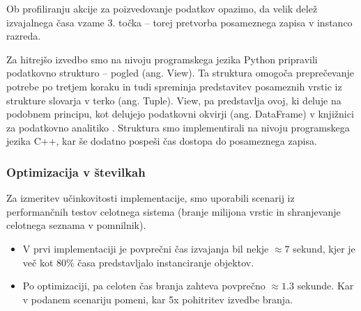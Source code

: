 \documentclass[a4paper,12pt,openright]{book}
\begin{document}
        \noindent
        Ob profiliranju akcije za poizvedovanje podatkov opazimo, da velik delež izvajalnega časa vzame 3. točka – torej pretvorba posameznega zapisa v instanco razreda.

        Za hitrejšo izvedbo smo na nivoju programskega jezika Python pripravili podatkovno strukturo – pogled (ang. View). Ta struktura omogoča preprečevanje potrebe po tretjem koraku in tudi spreminja predstavitev posameznih vrstic iz strukture slovarja v terko (ang. Tuple). View, pa predstavlja ovoj, ki deluje na podobnem principu, kot delujejo podatkovni okvirji (ang. DataFrame) v knjižnici za podatkovno analitiko \cite{PANDAS_GITHUB}. Struktura smo implementirali na nivoju programskega jezika C++, kar še dodatno pospeši čas dostopa do posameznega zapisa.

        \subsubsection{Optimizacija v številkah}
        Za izmeritev učinkovitosti implementacije, smo uporabili scenarij iz performančnih testov celotnega sistema (branje milijona vrstic in shranjevanje celotnega seznama v pomnilnik).
        \begin{itemize}
            \item V prvi implementaciji je povprečni čas izvajanja bil nekje $\approx 7$ sekund, kjer je več kot 80\% časa predstavljalo instanciranje objektov.
            \item Po optimizaciji, pa celoten čas branja zahteva povprečno $\approx 1.3$ sekunde. Kar v podanem scenariju pomeni, kar 5x pohitritev izvedbe branja.
        \end{itemize}
\end{document}
